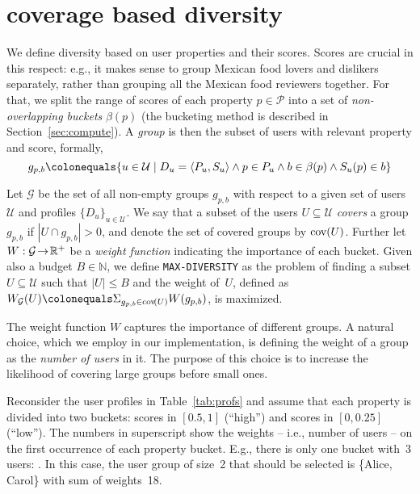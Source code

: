\section{coverage based diversity}
\label{sec:coverage} %

We define diversity based on user properties and their scores.  
Scores are crucial in this respect: e.g., it makes sense to group Mexican food lovers and dislikers separately, rather than grouping all the Mexican food reviewers together. For that, we split the range of scores of each property $p\in\mathcal{P}$ into a set of \emph{non-overlapping buckets} $\beta(p)$ (the bucketing method is described in Section~\ref{sec:compute}). A \emph{group} is then the subset of users with relevant property and score, formally,
\[g_{p,b}\colonequals \{u\in\mathcal{U}\mid D_u=\langle P_u, S_u \rangle \wedge p\in P_u \wedge  b\in\beta(p) \wedge S_u(p)\in b\}\]


\begin{definition}
	Let $\mathcal{G}$ be the set of all non-empty groups $g_{p,b}$ with respect to a given set of users $\mathcal{U}$ and profiles $\{D_u\}_{u\in\mathcal{U}}$.   
	We say that a subset of the users $U\subseteq\mathcal{U}$ \emph{covers} a group $g_{p,b}$ if $|U\cap g_{p,b}|>0$, and denote the set of covered groups by $\operatorname{cov}\!\left({U}\right)$. Further let $W:\mathcal{G} \!\rightarrow\! \mathbb{R}^{+}$ be a \emph{weight function} indicating the importance of each bucket. Given also a budget $B\in \mathbb{N}$,  we define \texttt{MAX-DIVERSITY} as the problem of finding a subset $U\subseteq\mathcal{U}$ such that $|U|\leq B$ and the weight of~$U$, defined as $W_{\mathcal{G}}(U)\colonequals\Sigma_{g_{p,b} \in \funct{cov}{U}}W(g_{p,b})$, is maximized.       	
\end{definition}

The weight function $W$ captures the importance of different groups. A natural choice, which we employ in our implementation, is defining the weight of a group as the \emph{number of users} in it. The purpose of this choice is to increase the likelihood of covering large groups before small ones.   



\begin{example}
	Reconsider the user profiles in Table~\ref{tab:profs} and assume that each property is divided into two buckets: scores in $[0.5,1]$ (``high'') and scores in $[0,0.25]$ (``low''). The numbers in superscript show the weights -- i.e., number of users -- on the first occurrence of each property bucket. E.g., there is only one bucket with~3 users: . %
	In this case, the user group of size~2 that should be selected is \{Alice, Carol\} with sum of weights~18. %
\end{example}

